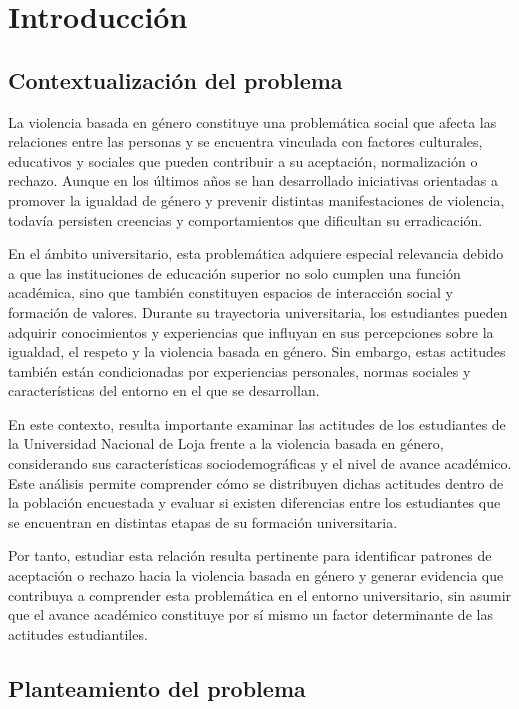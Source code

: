 \documentclass[
  spanish,
  11pt,
  letterpaper,
  DIV=11,
  numbers=noendperiod]{scrreprt}
\begin{document}
\chapter{Introducción}\label{introducciuxf3n}

\section{Contextualización del
problema}\label{contextualizaciuxf3n-del-problema}

La violencia basada en género constituye una problemática social que
afecta las relaciones entre las personas y se encuentra vinculada con
factores culturales, educativos y sociales que pueden contribuir a su
aceptación, normalización o rechazo. Aunque en los últimos años se han
desarrollado iniciativas orientadas a promover la igualdad de género y
prevenir distintas manifestaciones de violencia, todavía persisten
creencias y comportamientos que dificultan su erradicación.

En el ámbito universitario, esta problemática adquiere especial
relevancia debido a que las instituciones de educación superior no solo
cumplen una función académica, sino que también constituyen espacios de
interacción social y formación de valores. Durante su trayectoria
universitaria, los estudiantes pueden adquirir conocimientos y
experiencias que influyan en sus percepciones sobre la igualdad, el
respeto y la violencia basada en género. Sin embargo, estas actitudes
también están condicionadas por experiencias personales, normas sociales
y características del entorno en el que se desarrollan.

En este contexto, resulta importante examinar las actitudes de los
estudiantes de la Universidad Nacional de Loja frente a la violencia
basada en género, considerando sus características sociodemográficas y
el nivel de avance académico. Este análisis permite comprender cómo se
distribuyen dichas actitudes dentro de la población encuestada y evaluar
si existen diferencias entre los estudiantes que se encuentran en
distintas etapas de su formación universitaria.

Por tanto, estudiar esta relación resulta pertinente para identificar
patrones de aceptación o rechazo hacia la violencia basada en género y
generar evidencia que contribuya a comprender esta problemática en el
entorno universitario, sin asumir que el avance académico constituye por
sí mismo un factor determinante de las actitudes estudiantiles.

\section{Planteamiento del problema}\label{planteamiento-del-problema}
\end{document}
